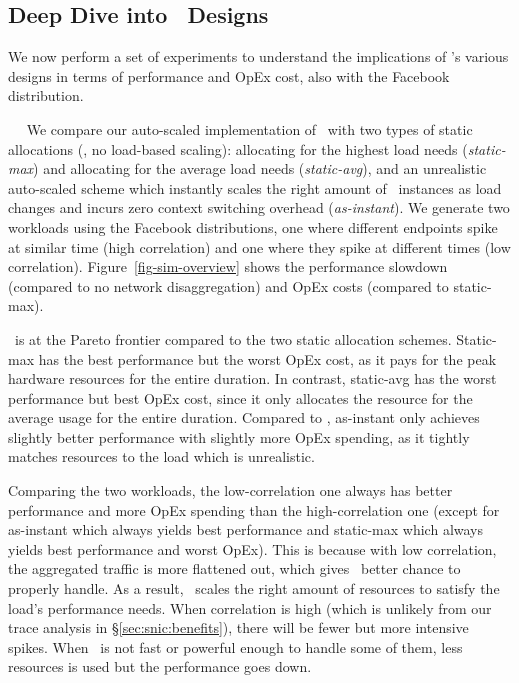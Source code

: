 \subsection{Deep Dive into \snic\ Designs}
\label{sec:snic:deepdive}

We now perform a set of experiments to understand the implications of \snic's various designs in terms of performance and OpEx cost, also with the Facebook distribution.

~~
We compare our auto-scaled implementation of \snic\ with two types of static allocations (\ie, no load-based scaling): allocating for the highest load needs ({\em static-max}) and allocating for the average load needs ({\em static-avg}), and an unrealistic auto-scaled scheme which instantly scales the right amount of \nt\ instances as load changes and incurs zero context switching overhead ({\em as-instant}).
We generate two workloads using the Facebook distributions, one where different endpoints spike at similar time (high correlation) and one where they spike at different times (low correlation).
Figure~\ref{fig-sim-overview} shows the performance slowdown (compared to no network disaggregation) and OpEx costs (compared to static-max).

\snic\ is at the Pareto frontier compared to the two static allocation schemes. Static-max has the best performance but the worst OpEx cost, as it pays for the peak hardware resources for the entire duration. In contrast, static-avg has the worst performance but best OpEx cost, since it only allocates the resource for the average usage for the entire duration.
Compared to \snic, as-instant only achieves slightly better performance with slightly more OpEx spending, as it tightly matches resources to the load which is unrealistic.

Comparing the two workloads, the low-correlation one always has better performance and more OpEx spending than the high-correlation one (except for as-instant which always yields best performance and static-max which always yields best performance and worst OpEx).
This is because with low correlation, the aggregated traffic is more flattened out, which gives \snic\ better chance to properly handle. As a result, \snic\ scales the right amount of resources to satisfy the load's performance needs.
When correlation is high (which is unlikely from our trace analysis in \S\ref{sec:snic:benefits}), there will be fewer but more intensive spikes. When \snic\ is not fast or powerful enough to handle some of them, less resources is used but the performance goes down.

